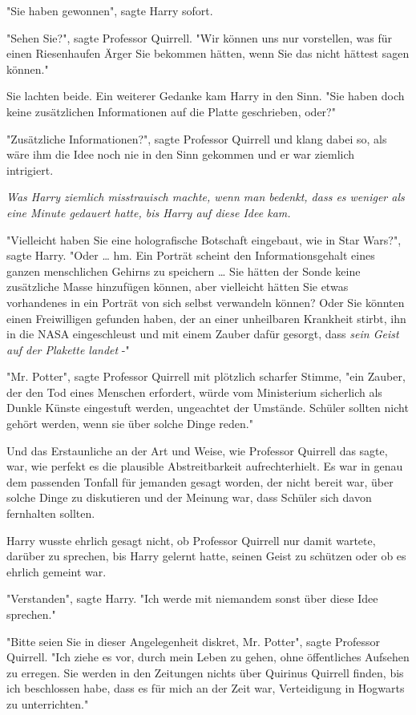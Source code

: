 {"Sie haben gewonnen", sagte Harry sofort.

"Sehen Sie?", sagte Professor Quirrell. "Wir können uns nur vorstellen, was für einen Riesenhaufen Ärger Sie bekommen hätten, wenn Sie das nicht hättest sagen können."

Sie lachten beide. Ein weiterer Gedanke kam Harry in den Sinn. "Sie haben doch keine zusätzlichen Informationen auf die Platte geschrieben, oder?"

"Zusätzliche Informationen?", sagte Professor Quirrell und klang dabei so, als wäre ihm die Idee noch nie in den Sinn gekommen und er war ziemlich\\ intrigiert.

\emph{Was Harry ziemlich misstrauisch machte, wenn man bedenkt, dass es weniger als eine Minute gedauert hatte, bis Harry auf diese Idee kam.}

"Vielleicht haben Sie eine holografische Botschaft eingebaut, wie in Star Wars?", sagte Harry. "Oder … hm. Ein Porträt scheint den Informationsgehalt eines ganzen menschlichen Gehirns zu speichern … Sie hätten der Sonde keine zusätzliche Masse hinzufügen können, aber vielleicht hätten Sie etwas vorhandenes in ein Porträt von sich selbst verwandeln können? Oder Sie könnten einen Freiwilligen gefunden haben, der an einer unheilbaren Krankheit stirbt, ihn in die NASA eingeschleust und mit einem Zauber dafür gesorgt, dass \emph{sein Geist auf der Plakette landet} -"

"Mr. Potter", sagte Professor Quirrell mit plötzlich scharfer Stimme, "ein Zauber, der den Tod eines Menschen erfordert, würde vom Ministerium sicherlich als Dunkle Künste eingestuft werden, ungeachtet der Umstände. Schüler sollten nicht gehört werden, wenn sie über solche Dinge reden."

Und das Erstaunliche an der Art und Weise, wie Professor Quirrell das sagte, war, wie perfekt es die plausible Abstreitbarkeit aufrechterhielt. Es war in genau dem passenden Tonfall für jemanden gesagt worden, der nicht bereit war, über solche Dinge zu diskutieren und der Meinung war, dass Schüler sich davon fernhalten sollten.

Harry wusste ehrlich gesagt nicht, ob Professor Quirrell nur damit wartete, darüber zu sprechen, bis Harry gelernt hatte, seinen Geist zu schützen oder ob es ehrlich gemeint war.

"Verstanden", sagte Harry. "Ich werde mit niemandem sonst über diese Idee sprechen."

"Bitte seien Sie in dieser Angelegenheit diskret, Mr. Potter", sagte Professor Quirrell. "Ich ziehe es vor, durch mein Leben zu gehen, ohne öffentliches Aufsehen zu erregen. Sie werden in den Zeitungen nichts über Quirinus Quirrell finden, bis ich beschlossen habe, dass es für mich an der Zeit war, Verteidigung in Hogwarts zu unterrichten."

}
